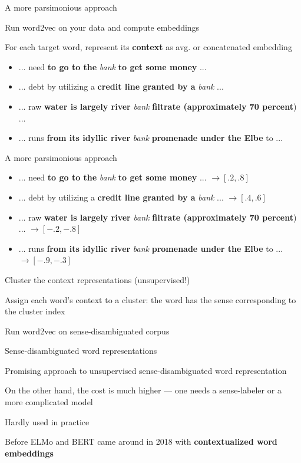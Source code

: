 \documentclass[12pt]{beamer}
\begin{document}
\begin{frame}{A more parsimonious approach}
	
	Run word2vec on your data and compute embeddings
	
	For each target word, represent its \textbf{context} as avg. or concatenated embedding
	
	\begin{itemize}
	\item ... need \textbf{to go to the} \emph{bank} \textbf{to get some money} ...
\item ... debt by utilizing a \textbf{credit line granted by a} \emph{bank} ...
\item ... raw \textbf{water is largely river} \emph{bank} \textbf{filtrate (approximately 70 percent}) ...
\item ... runs \textbf{from its idyllic river} \emph{bank} \textbf{promenade under the Elbe} to ...
	\end{itemize}
	
\end{frame}

\begin{frame}{A more parsimonious approach}
	
	\begin{itemize}
		\item ... need \textbf{to go to the} \emph{bank} \textbf{to get some money} ... $\to [.2,.8]$
		\item ... debt by utilizing a \textbf{credit line granted by a} \emph{bank} ... $\to [.4,.6]$
		\item ... raw \textbf{water is largely river} \emph{bank} \textbf{filtrate (approximately 70 percent}) ... $\to [-.2,-.8]$
		\item ... runs \textbf{from its idyllic river} \emph{bank} \textbf{promenade under the Elbe} to ... $\to [-.9,-.3]$
	\end{itemize}

Cluster the context representations (unsupervised!)

Assign each word’s context to a cluster: the word has the sense corresponding to the cluster index

Run word2vec on sense-disambiguated corpus 
	
\end{frame}

\begin{frame}{Sense-disambiguated word representations}

Promising approach to unsupervised sense-disambiguated word representation

On the other hand, the cost is much higher --- one needs a sense-labeler or a more complicated model

Hardly used in practice

Before ELMo and BERT came around in 2018 with \textbf{contextualized word embeddings}

\end{frame}
\end{document}
